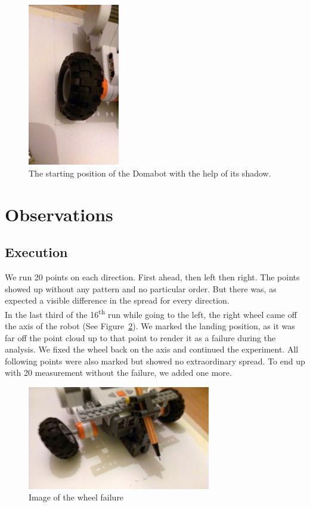 \documentclass{scrartcl}
\begin{document}
\begin{figure}
 \center
 \includegraphics[width= 4cm]{img/wheel_adjust.jpg}
 \caption{The starting position of the Domabot with the help of its shadow.}
 \label{fig:setup}
\end{figure}



\section{Observations}
\subsection{Execution}

We run 20 points on each direction. First ahead, then left then right. The points showed up without any pattern and no particular order. But there was, as expected a visible difference in the spread for every direction.\\
In the last third of the 16\textsuperscript{th} run while going to the left, the right wheel came off the axis of the robot (See Figure~\ref{fig:failure}).
We marked the landing position, as it was far off the point cloud up to that point to render it as a failure during the analysis. We fixed the wheel back on the axis and continued the experiment. All following points were also marked but showed no extraordinary spread. To end up with 20 measurement without the failure, we added one more.

\begin{figure}
 \center
 \includegraphics[width= 8cm]{img/wheel_failure.jpg}
 \caption{Image of the wheel failure}
 \label{fig:failure}
\end{figure}
\end{document}
